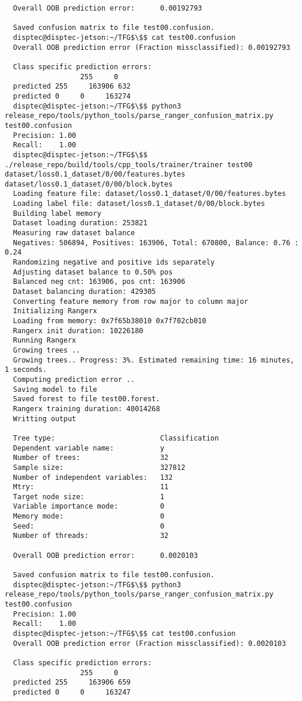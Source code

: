 \documentclass[12pt,oneside]{book}
\begin{document}
\begin{lstlisting}
  Overall OOB prediction error:      0.00192793
  
  Saved confusion matrix to file test00.confusion.
  disptec@disptec-jetson:~/TFG$\$$ cat test00.confusion 
  Overall OOB prediction error (Fraction missclassified): 0.00192793
  
  Class specific prediction errors:
                  255     0
  predicted 255     163906 632   
  predicted 0     0     163274 
  disptec@disptec-jetson:~/TFG$\$$ python3 release_repo/tools/python_tools/parse_ranger_confusion_matrix.py test00.confusion 
  Precision: 1.00
  Recall:    1.00
  disptec@disptec-jetson:~/TFG$\$$ ./release_repo/build/tools/cpp_tools/trainer/trainer test00 dataset/loss0.1_dataset/0/00/features.bytes dataset/loss0.1_dataset/0/00/block.bytes 
  Loading feature file: dataset/loss0.1_dataset/0/00/features.bytes
  Loading label file: dataset/loss0.1_dataset/0/00/block.bytes
  Building label memory
  Dataset loading duration: 253821
  Measuring raw dataset balance
  Negatives: 506894, Positives: 163906, Total: 670800, Balance: 0.76 : 0.24
  Randomizing negative and positive ids separately
  Adjusting dataset balance to 0.50% pos
  Balanced neg cnt: 163906, pos cnt: 163906
  Dataset balancing duration: 429305
  Converting feature memory from row major to column major
  Initializing Rangerx
  Loading from memory: 0x7f65b38010 0x7f702cb010
  Rangerx init duration: 10226180
  Running Rangerx
  Growing trees ..
  Growing trees.. Progress: 3%. Estimated remaining time: 16 minutes, 1 seconds.
  Computing prediction error ..
  Saving model to file
  Saved forest to file test00.forest.
  Rangerx training duration: 40014268
  Writting output
  
  Tree type:                         Classification
  Dependent variable name:           y
  Number of trees:                   32
  Sample size:                       327812
  Number of independent variables:   132
  Mtry:                              11
  Target node size:                  1
  Variable importance mode:          0
  Memory mode:                       0
  Seed:                              0
  Number of threads:                 32
  
  Overall OOB prediction error:      0.0020103
  
  Saved confusion matrix to file test00.confusion.
  disptec@disptec-jetson:~/TFG$\$$ python3 release_repo/tools/python_tools/parse_ranger_confusion_matrix.py test00.confusion 
  Precision: 1.00
  Recall:    1.00
  disptec@disptec-jetson:~/TFG$\$$ cat test00.confusion 
  Overall OOB prediction error (Fraction missclassified): 0.0020103
  
  Class specific prediction errors:
                  255     0
  predicted 255     163906 659   
  predicted 0     0     163247
\end{lstlisting}
\end{document}

